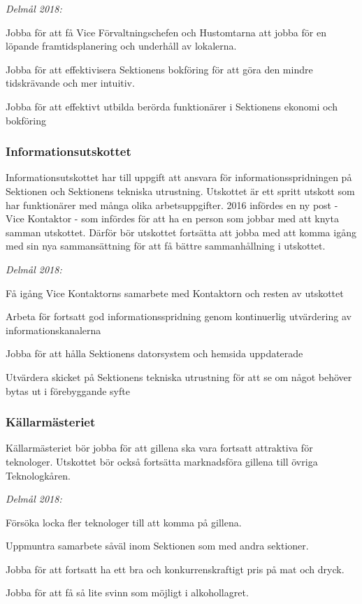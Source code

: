 \documentclass[../_main/handlingar.tex]{subfiles}
\begin{document}
\emph{Delmål 2018:}
\begin{dashlist}
    \item Jobba för att få Vice Förvaltningschefen och Hustomtarna att jobba för en löpande framtidsplanering och underhåll av lokalerna. 
    \item Jobba för att effektivisera Sektionens bokföring för att göra den mindre tidskrävande och mer intuitiv. 
    \item Jobba för att effektivt utbilda berörda funktionärer i Sektionens ekonomi och bokföring
\end{dashlist}

\newpage

\subsubsection*{Informationsutskottet}
Informationsutskottet har till uppgift att ansvara för informationsspridningen på Sektionen och Sektionens tekniska utrustning. Utskottet är ett spritt utskott som har funktionärer med många olika arbetsuppgifter. 2016 infördes en ny post - Vice Kontaktor - som infördes för att ha en person som jobbar med att knyta samman utskottet. Därför bör utskottet fortsätta att jobba med att komma igång med sin nya sammansättning för att få bättre sammanhållning i utskottet.

\emph{Delmål 2018:}
\begin{dashlist}
    \item Få igång Vice Kontaktorns samarbete med Kontaktorn och resten av utskottet
    \item Arbeta för fortsatt god informationsspridning genom kontinuerlig utvärdering av informationskanalerna
    \item Jobba för att hålla Sektionens datorsystem och hemsida uppdaterade
    \item Utvärdera skicket på Sektionens tekniska utrustning för att se om något behöver bytas ut i förebyggande syfte
\end{dashlist}

\subsubsection*{Källarmästeriet}
Källarmästeriet bör jobba för att gillena ska vara fortsatt attraktiva för teknologer. Utskottet bör också fortsätta marknadsföra gillena till övriga Teknologkåren. 

\emph{Delmål 2018:}
\begin{dashlist}
    \item Försöka locka fler teknologer till att komma på gillena. 
    \item Uppmuntra samarbete såväl inom Sektionen som med andra sektioner. 
    \item Jobba för att fortsatt ha ett bra och konkurrenskraftigt pris på mat och dryck. 
    \item Jobba för att få så lite svinn som möjligt i alkohollagret.     
\end{dashlist}
\end{document}
